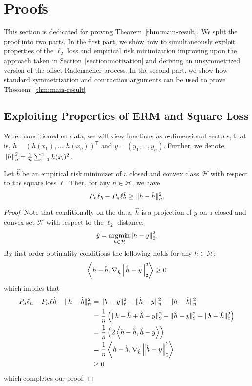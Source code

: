 \documentclass[main.tex]{subfiles}
\begin{document}
\section{Proofs}
\label{section:proof}

This section is dedicated for proving Theorem~\ref{thm:main-result}.
We split the proof into two parts. In the first part, we show how
to simultaneously exploit properties of the $\ell_{2}$ loss and
empirical risk minimization improving upon the approach taken in
Section~\ref{section:motivation} and deriving an unsymmetrized version
of the offset Rademacher process.
In the second part, we show how standard symmetrization and contraction
arguments can be used to prove Theorem~\ref{thm:main-result}


\subsection{Exploiting Properties of ERM and Square Loss}

When conditioned on data, we will view functions as $n$-dimensional vectors,
that is, $h = (h(x_{1}), \dots, h(x_{n}))^{\mathsf{T}}$ and
$y = (y_{1}, \dots, y_{n})$. Further, we denote $\left\lVert h \right\rVert_{n}^{2} =
\frac{1}{n}\sum_{i=1}^{n} h(x_{i})^{2}$.


\begin{lemma}
  \label{lemma:projection}
  Let $\hat{h}$ be an empirical risk minimizer of a closed and convex
  class $\mathcal{H}$ with respect to the square loss $\ell$.
  Then, for any $h \in \mathcal{H}$, we have
  $$
    P_{n}\ell_{h} - P_{n}\ell{\hat{h}} \geq \lVert h - \hat{h} \rVert_{n}^{2}.
  $$
\end{lemma}

\begin{proof}
  Note that conditionally on the data, $\hat{h}$ is a projection
  of $y$ on a closed and convex set $\mathcal{H}$ with respect to
  the $\ell_{2}$ distance:
  $$
    \hat{y} = \underset{h \in \mathcal{H}}{\operatorname{arg}\!\operatorname{min}}{\left\lVert h - y \right\rVert_{2}^{2}}.
  $$
  By first order optimality conditions the following holds for any
  $h \in \mathcal{H}$:
  $$
    \left\langle {h - \hat{h}}, {\nabla_{\hat{h}}\left\lVert \hat{h} - y \right\rVert_{2}^{2}} \right\rangle
    \geq 0
  $$
  which implies that
  \begin{align*}
    P_{n}\ell_{h} - P_{n}\ell{\hat{h}} - \lVert h - \hat{h} \rVert_{n}^{2}
    &=
    \lVert h - y \rVert_{n}^{2} - \lVert \hat{h} - y \rVert_{n}^{2} - \lVert h - \hat{h} \rVert_{n}^{2} \\ &=
    \frac{1}{n}
    \left(\lVert h - \hat{h} + \hat{h} - y \rVert_{2}^{2} - \lVert \hat{h} - y \rVert_{2}^{2}
    - \lVert h - \hat{h} \rVert_{2}^{2}\right) \\
    &=
    \frac{1}{n}\left(
      2\left\langle {h -\hat{h}}, {\hat{h} - y} \right\rangle
    \right) \\
    &=
    \frac{1}{n}\left\langle {h - \hat{h}}, {\nabla_{\hat{h}}\left\lVert \hat{h} - y \right\rVert_{2}^{2}} \right\rangle \\
    &\geq 0
  \end{align*}
  which completes our proof.
\end{proof}
\end{document}
